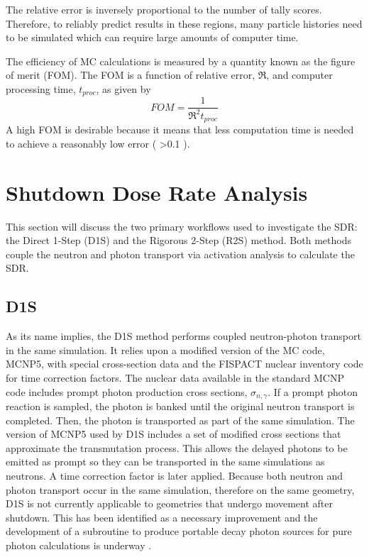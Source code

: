 The relative error is inversely proportional to the number of tally scores.
Therefore, to reliably predict results in these regions, many particle
histories need to be simulated which can require large amounts of computer time.

The efficiency of MC calculations is measured by a quantity known as the figure of merit
(FOM).  The FOM is a function of relative error, $\Re$, and computer processing
time, $t_{proc}$, 
as given by
\begin{equation} \label{eq:1.3}
	FOM = \frac{1}{{{{\Re}^2}t_{proc}}}
\end{equation}
A high FOM is desirable because it means that less computation time is needed to achieve
a reasonably low error ( >0.1 \cite{mcnp_manual}). 

\section{Shutdown Dose Rate Analysis}\label{sec:sdr_calcs}
This section will discuss the two primary workflows used to investigate the SDR:
the Direct 1-Step (D1S) \cite{d1s} and the Rigorous 2-Step (R2S) \cite{r2s}
method.  Both methods couple the neutron and photon transport via activation
analysis to calculate the SDR.

\subsection{D1S}
As its name implies, the D1S method performs coupled neutron-photon transport
in the same simulation.  It relies upon a modified version of the MC code,
MCNP5, with special cross-section data and the FISPACT nuclear inventory code
for time correction factors.  
The nuclear data available in the standard MCNP code includes prompt photon 
production cross sections, $\sigma_{n,\gamma}$.
If a prompt photon reaction is sampled,
the photon is banked until the original neutron transport is
completed. Then, the photon is transported as part of the same simulation.
The version of MCNP5 used by D1S includes a set of modified cross sections that
approximate the transmutation process.  This allows the delayed 
photons to be emitted as prompt so they can be transported in the same simulations
as neutrons. A time correction factor is later applied.
Because both neutron and photon transport occur in the same simulation,
therefore on the same geometry, D1S
is not currently applicable to geometries that undergo movement after shutdown.
This has been identified as a necessary improvement and the development of a
subroutine to produce portable decay photon sources for pure photon
calculations is underway \cite{adv-d1s}. 

